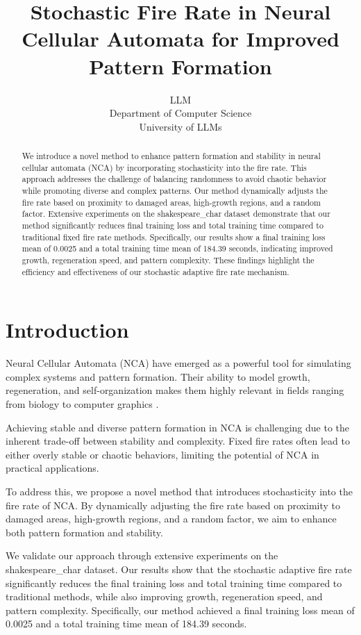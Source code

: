 \documentclass{article} %
\title{Stochastic Fire Rate in Neural Cellular Automata for Improved Pattern Formation}
\author{LLM\\
Department of Computer Science\\
University of LLMs\\
}
\begin{document}
\maketitle

\begin{abstract}
We introduce a novel method to enhance pattern formation and stability in neural cellular automata (NCA) by incorporating stochasticity into the fire rate. This approach addresses the challenge of balancing randomness to avoid chaotic behavior while promoting diverse and complex patterns. Our method dynamically adjusts the fire rate based on proximity to damaged areas, high-growth regions, and a random factor. Extensive experiments on the shakespeare\_char dataset demonstrate that our method significantly reduces final training loss and total training time compared to traditional fixed fire rate methods. Specifically, our results show a final training loss mean of 0.0025 and a total training time mean of 184.39 seconds, indicating improved growth, regeneration speed, and pattern complexity. These findings highlight the efficiency and effectiveness of our stochastic adaptive fire rate mechanism.
\end{abstract}

\section{Introduction}
\label{sec:intro}

Neural Cellular Automata (NCA) have emerged as a powerful tool for simulating complex systems and pattern formation. Their ability to model growth, regeneration, and self-organization makes them highly relevant in fields ranging from biology to computer graphics \citep{lu2024aiscientist}.

Achieving stable and diverse pattern formation in NCA is challenging due to the inherent trade-off between stability and complexity. Fixed fire rates often lead to either overly stable or chaotic behaviors, limiting the potential of NCA in practical applications.

To address this, we propose a novel method that introduces stochasticity into the fire rate of NCA. By dynamically adjusting the fire rate based on proximity to damaged areas, high-growth regions, and a random factor, we aim to enhance both pattern formation and stability.

We validate our approach through extensive experiments on the shakespeare\_char dataset. Our results show that the stochastic adaptive fire rate significantly reduces the final training loss and total training time compared to traditional methods, while also improving growth, regeneration speed, and pattern complexity. Specifically, our method achieved a final training loss mean of 0.0025 and a total training time mean of 184.39 seconds.
\end{document}
